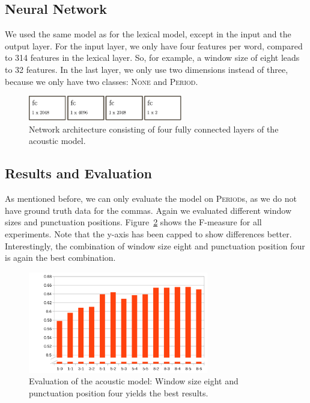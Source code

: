 \subsection{Neural Network}

We used the same model as for the lexical model, except in the input and the output layer.
For the input layer, we only have four features per word, compared to 314 features in the lexical layer.
So, for example, a window size of eight leads to 32 features.
In the last layer, we only use two dimensions instead of three, because we only have two classes: \textsc{None} and \textsc{Period}.

\begin{figure}[ht]
    \centering
    \includegraphics[width=0.6\textwidth]{img/net_acoustic.pdf}
    \caption{Network architecture consisting of four fully connected layers of the acoustic model.}
    \label{fig:net_acoustic}
\end{figure}


\subsection{Results and Evaluation}

As mentioned before, we can only evaluate the model on \textsc{Period}s, as we do not have ground truth data for the commas.
Again we evaluated different window sizes and punctuation positions.
Figure~\ref{audio_eval} shows the F-measure for all experiments.
Note that the y-axis has been capped to show differences better.
Interestingly, the combination of window size eight and punctuation position four is again the best combination.

\begin{figure}[ht]
    \centering
    \includegraphics[width=0.7\textwidth]{img/audio_parameter_eval.png}
    \caption{Evaluation of the acoustic model: Window size eight and punctuation position four yields the best results.}
    \label{audio_eval}
\end{figure}

